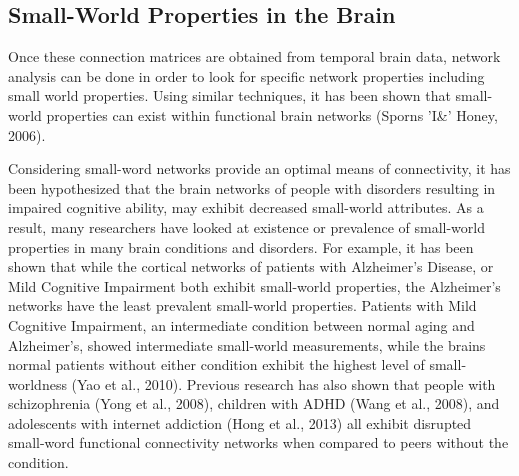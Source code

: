 \documentclass[11pt,letterpaper,doublespacing,titlepage]{article}
\begin{document}
\subsection{Small-World Properties in the Brain}
\par
Once these connection matrices are obtained from temporal brain data, network analysis can be done in order to look for specific network properties including small world properties. Using similar techniques, it has been shown that small-world properties can exist within functional brain networks (Sporns 'I\&' Honey, 2006). 
\par
Considering small-word networks provide an optimal means of connectivity, it has been hypothesized that the brain networks of people with disorders resulting in impaired cognitive ability, may exhibit decreased small-world attributes. As a result, many researchers have looked at existence or prevalence of small-world properties in many brain conditions and disorders. For example, it has been shown that while the cortical networks of patients with Alzheimer’s Disease, or Mild Cognitive Impairment both exhibit small-world properties, the Alzheimer’s networks have the least prevalent small-world properties. Patients with Mild Cognitive Impairment, an intermediate condition between normal aging and Alzheimer’s, showed intermediate small-world measurements, while the brains normal patients without either condition exhibit the highest level of small-worldness (Yao et al., 2010).  Previous research has also shown that people with schizophrenia (Yong et al., 2008), children with ADHD (Wang et al., 2008), and adolescents with internet addiction (Hong et al., 2013) all exhibit disrupted small-word functional connectivity networks when compared to peers without the condition.
\end{document}
